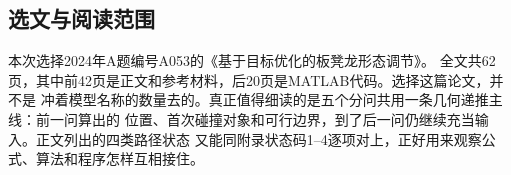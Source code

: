 \subsection{选文与阅读范围}

本次选择2024年A题编号A053的《基于目标优化的板凳龙形态调节》\cite{A053}。
全文共62页，其中前42页是正文和参考材料，后20页是MATLAB代码。选择这篇论文，并不是
冲着模型名称的数量去的。真正值得细读的是五个分问共用一条几何递推主线：前一问算出的
位置、首次碰撞对象和可行边界，到了后一问仍继续充当输入。正文列出的四类路径状态
又能同附录状态码1--4逐项对上，正好用来观察公式、算法和程序怎样互相接住。

